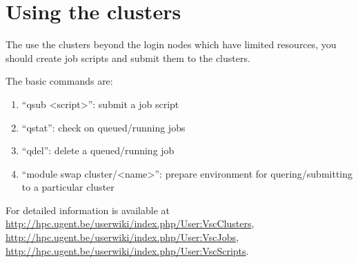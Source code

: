 \chapter{Using the clusters}

The use the clusters beyond the login nodes which have limited resources, you
should create job scripts and submit them to the clusters.

The basic commands are:

\begin{enumerate}
 \item``qsub <script>'': submit a job script
 \item``qstat'': check on queued/running jobs
 \item``qdel'': delete a queued/running job
 \item``module swap cluster/<name>'': prepare environment for quering/submitting to a particular cluster
\end{enumerate}

For detailed information is available at
\url{http://hpc.ugent.be/userwiki/index.php/User:VscClusters},
\url{http://hpc.ugent.be/userwiki/index.php/User:VscJobs},
\url{http://hpc.ugent.be/userwiki/index.php/User:VscScripts}.


